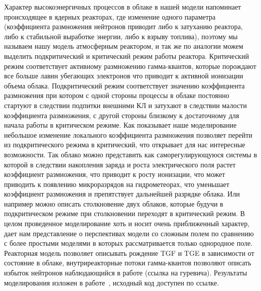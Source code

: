 Характер высокоэнергичных процессов в облаке в нашей модели напоминает происходящее в ядерных реакторах, где изменение одного параметра (коэффициента размножения нейтронов приводит либо к затуханию реактора, либо к стабильной выработке энергии, либо к взрыву топлива), поэтому мы называем нашу модель атмосферным реактором, и так же по аналогии можем выделить подкритический и критический режим работы реактора. Критический режим соответствует активному размножению гамма-квантов, которые порождают все больше лавин убегающих электронов что приводит к активной ионизации объема облака. Подкритический режим соответствует значению коэффициента размножения  при котором с одной стороны процессы в облаке постоянно стартуют в следствии подпитки внешними КЛ и затухают в следствии малости коэффициента размножения, с другой стороны  близкому к достаточному для начала работы в критическом режиме. Как показывает наше моделирование небольшое изменение локального коэффициента размножения позволяет перейти из подкритического режима в критический, что открывает для нас интересные возможности. Так облако можно представить как саморегулирующуюся системы в которой в следствии накопления заряда и роста электрического поля растет коэффициент размножения, что приводит к росту ионизации, что может приводить к появлению микроразрядов на гидрометеорах, что уменьшает коэффициент размножения и препятствует дальнейшей разрядке облака. Или например можно описать столкновение двух облаков, которые будучи в подкритическом режиме при столкновении переходят в критический режим. В целом проведенное моделирование хоть и носит очень приближенный характер, дает нам представление о перспективах модели со сложным полем по сравнению с более простыми моделями в которых рассматривается только однородное поле. Реакторная модель позволяет описывать рождение TGF и TGE в зависимости от состояние в облаке, внутриреакторные потоки гамма-квантов позволяют описать избыток нейтронов наблюдающийся в работе (ссылка на гуревича). Результаты моделирования изложен в работе~\cite{reactor}, исходный код доступен по ссылке.

